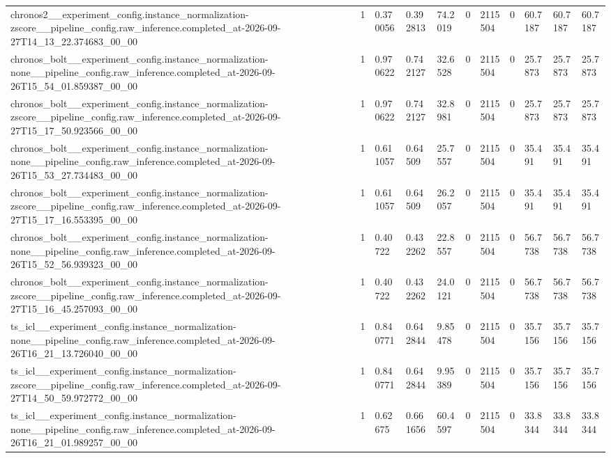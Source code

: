 \begin{tabular}{lllllllllll}
chronos2\_\_experiment\_config.instance\_normalization-zscore\_\_pipeline\_config.raw\_inference.completed\_at-2026-09-27T14\_13\_22.374683\_00\_00 & 1 & 0.370056 & 0.392813 & 74.2019 & 0 & 2115504 & 0 & 60.7187 & 60.7187 & 60.7187 \\
chronos\_bolt\_\_experiment\_config.instance\_normalization-none\_\_pipeline\_config.raw\_inference.completed\_at-2026-09-26T15\_54\_01.859387\_00\_00 & 1 & 0.970622 & 0.742127 & 32.6528 & 0 & 2115504 & 0 & 25.7873 & 25.7873 & 25.7873 \\
chronos\_bolt\_\_experiment\_config.instance\_normalization-zscore\_\_pipeline\_config.raw\_inference.completed\_at-2026-09-27T15\_17\_50.923566\_00\_00 & 1 & 0.970622 & 0.742127 & 32.8981 & 0 & 2115504 & 0 & 25.7873 & 25.7873 & 25.7873 \\
chronos\_bolt\_\_experiment\_config.instance\_normalization-none\_\_pipeline\_config.raw\_inference.completed\_at-2026-09-26T15\_53\_27.734483\_00\_00 & 1 & 0.611057 & 0.64509 & 25.7557 & 0 & 2115504 & 0 & 35.491 & 35.491 & 35.491 \\
chronos\_bolt\_\_experiment\_config.instance\_normalization-zscore\_\_pipeline\_config.raw\_inference.completed\_at-2026-09-27T15\_17\_16.553395\_00\_00 & 1 & 0.611057 & 0.64509 & 26.2057 & 0 & 2115504 & 0 & 35.491 & 35.491 & 35.491 \\
chronos\_bolt\_\_experiment\_config.instance\_normalization-none\_\_pipeline\_config.raw\_inference.completed\_at-2026-09-26T15\_52\_56.939323\_00\_00 & 1 & 0.40722 & 0.432262 & 22.8557 & 0 & 2115504 & 0 & 56.7738 & 56.7738 & 56.7738 \\
chronos\_bolt\_\_experiment\_config.instance\_normalization-zscore\_\_pipeline\_config.raw\_inference.completed\_at-2026-09-27T15\_16\_45.257093\_00\_00 & 1 & 0.40722 & 0.432262 & 24.0121 & 0 & 2115504 & 0 & 56.7738 & 56.7738 & 56.7738 \\
ts\_icl\_\_experiment\_config.instance\_normalization-none\_\_pipeline\_config.raw\_inference.completed\_at-2026-09-26T16\_21\_13.726040\_00\_00 & 1 & 0.840771 & 0.642844 & 9.85478 & 0 & 2115504 & 0 & 35.7156 & 35.7156 & 35.7156 \\
ts\_icl\_\_experiment\_config.instance\_normalization-zscore\_\_pipeline\_config.raw\_inference.completed\_at-2026-09-27T14\_50\_59.972772\_00\_00 & 1 & 0.840771 & 0.642844 & 9.95389 & 0 & 2115504 & 0 & 35.7156 & 35.7156 & 35.7156 \\
ts\_icl\_\_experiment\_config.instance\_normalization-none\_\_pipeline\_config.raw\_inference.completed\_at-2026-09-26T16\_21\_01.989257\_00\_00 & 1 & 0.62675 & 0.661656 & 60.4597 & 0 & 2115504 & 0 & 33.8344 & 33.8344 & 33.8344 \\

\end{tabular}

